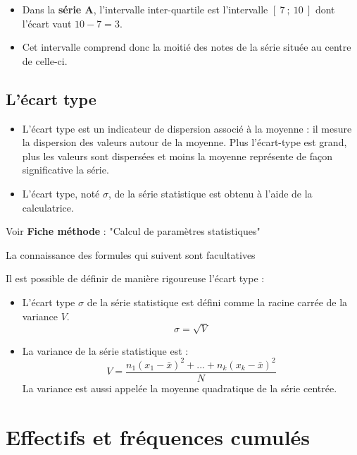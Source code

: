 \begin{ex}{}{}
   \begin{itemize}
      \item  Dans la \textbf{série A}, l'intervalle inter-quartile est l'intervalle $[~7~;~10~]$ dont l'écart vaut $10-7=3$.
      \item  Cet intervalle comprend donc la moitié des notes de la série située au centre de celle-ci.
   \end{itemize}
\end{ex}

\subsection{L'écart type}

\begin{defi}{}{}
\begin{itemize}
\item[-]L'écart type est un indicateur de dispersion associé à la moyenne : il mesure la dispersion des valeurs autour de la moyenne. Plus l'écart-type est grand, plus les valeurs sont dispersées et moins la moyenne représente de façon significative la série.
\item[-]L'écart type, noté $\sigma$, de la série statistique est obtenu à l'aide de la calculatrice.
\end{itemize}
\end{defi}

\medskip
Voir \textbf{Fiche méthode} : "Calcul de paramètres statistiques"

\begin{rem}{}{}
La connaissance des formules qui suivent sont facultatives

Il est possible de définir de manière rigoureuse l'écart type :
\begin{itemize}
\item[-]L'écart type $\sigma$ de la série statistique est défini comme la racine carrée de la variance $V$.
\[\sigma = \sqrt{V}\]
\item[-]La variance de la série statistique est :
\[V = \frac{n_{1}(x_{1}-\bar x)^{2}+...+n_{k}(x_{k}-\bar x)^{2}}{N}\]
La variance est aussi appelée la moyenne quadratique de la série centrée.
\end{itemize}
\end{rem}

\section{Effectifs et fréquences cumulés}

